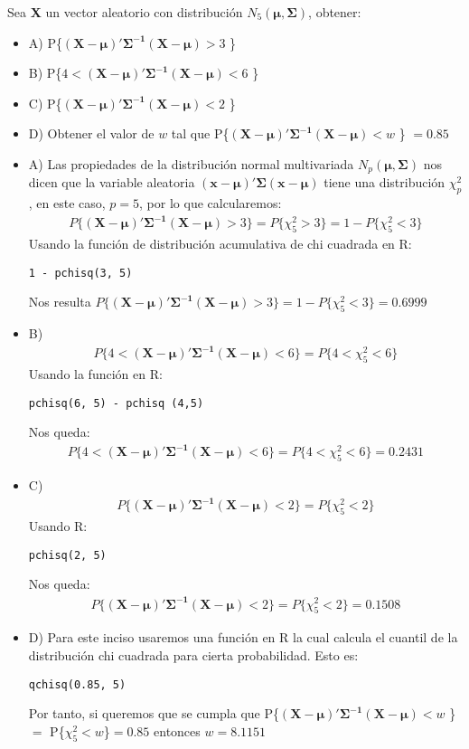 \begin{problem}{7}
Sea \textbf{X} un vector aleatorio con distribución $N_5(\mathbf{\mu,\Sigma})$, obtener:
\begin{itemize}
\item A) P\{$\mathbf{(X-\mu)'\Sigma^{-1}(X-\mu)}>3$ \}
\item B) P\{$4<\mathbf{(X-\mu)'\Sigma^{-1}(X-\mu)}<6$ \}
\item C) P\{$\mathbf{(X-\mu)'\Sigma^{-1}(X-\mu)}<2$ \}
\item D) Obtener el valor de $w$ tal que P\{$\mathbf{(X-\mu)'\Sigma^{-1}(X-\mu)}<w$ \} $=0.85$
\end{itemize}
\end{problem}
\begin{sol}
\begin{itemize}
\item A) Las propiedades de la distribución normal multivariada $N_p(\mathbf{\mu,\Sigma})$ nos dicen que la variable aleatoria $\mathbf{(x-\mu)'\Sigma (x-\mu)}$ tiene una distribución $\chi_p^2$, en este caso, $p=5$, por lo que calcularemos:
\begin{align*}
 P\{\mathbf{(X-\mu)'\Sigma^{-1}(X-\mu)}>3 \} = P \{\chi_5^2>3\} = 1 - P \{\chi_5^2<3 \}
\end{align*}
Usando la función de distribución acumulativa de chi cuadrada en R:
\begin{verbatim}
1 - pchisq(3, 5)
\end{verbatim}
Nos resulta $ P\{\mathbf{(X-\mu)'\Sigma^{-1}(X-\mu)}>3 \} = 1 - P \{\chi_5^2<3 \}=0.6999$
\item B)
\begin{align*}
P\{4<\mathbf{(X-\mu)'\Sigma^{-1}(X-\mu)}<6 \} =  P\{4<\chi_5^2<6 \}
\end{align*}
Usando la función en R:
\begin{verbatim}
pchisq(6, 5) - pchisq (4,5)
\end{verbatim}
Nos queda:
\begin{align*}
P\{4<\mathbf{(X-\mu)'\Sigma^{-1}(X-\mu)}<6 \} =  P\{4<\chi_5^2<6 \} = 0.2431
\end{align*}
\item C)
\begin{align*}
P\{\mathbf{(X-\mu)'\Sigma^{-1}(X-\mu)}<2 \} = P\{\chi_5^2<2 \}
\end{align*}
Usando R:
\begin{verbatim}
pchisq(2, 5)
\end{verbatim}
Nos queda:
\begin{align*}
P\{\mathbf{(X-\mu)'\Sigma^{-1}(X-\mu)}<2 \} = P\{\chi_5^2<2 \} = 0.1508
\end{align*}
\item D)
Para este inciso usaremos una función en R la cual calcula el cuantil de la distribución chi cuadrada para cierta probabilidad. Esto es:
\begin{verbatim}
qchisq(0.85, 5)
\end{verbatim}
Por tanto, si queremos que se cumpla que P\{$\mathbf{(X-\mu)'\Sigma^{-1}(X-\mu)}<w$ \} $=$ P\{$\chi_5^2<w$\}$=0.85$ entonces $w=8.1151$
\end{itemize}
\end{sol}